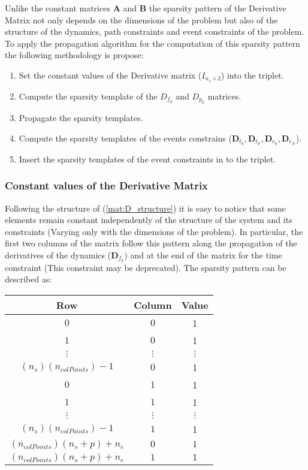 \documentclass[12pt]{article}
\begin{document}
Unlike the constant matrices $\bm{A}$ and $\bm{B}$ the sparsity pattern of the Derivative Matrix not only depends on the dimensions of the problem but also of the structure of the dynamics, path constraints and event constraints of the problem. To apply the propagation algorithm for the computation of this sparsity pattern the following methodology is propose:

\begin{enumerate}
    \item Set the constant values of the Derivative matrix ($I_{n_s \times 2}$) into the triplet.
    \item Compute the sparsity template of the $D_{f_k}$ and $D_{p_k}$ matrices.
    \item Propagate the sparsity templates.
    \item Compute the sparsity templates of the events constrains ($\bm{D}_{t_0},\bm{D}_{t_F},\bm{D}_{e_0},\bm{D}_{e_N}$).
    \item Insert the sparsity templates of the event constraints in to the triplet.
\end{enumerate}

\subsubsection{Constant values of the Derivative Matrix}

Following the structure of (\ref{mat:D_structure}) it is easy to notice that some elements remain constant independently of the structure of the system and its constraints (Varying only with the dimensions of the problem). In particular, the first two columns of the matrix follow this pattern along the propagation of the derivatives of the dynamics ($\bm{D}_{f_k}$) and at the end of the matrix for the time constraint (This constraint may be deprecated). The sparsity pattern can be described as:

\begin{table}[h]
\begin{center}
\begin{tabular}{c|c|c}
Row    & Column        & Value \\ \hline
$0$      & $0$             & 1    \\
$1$    & $0$           & 1    \\
$\vdots$ & $\vdots$   &    $\vdots$     \\
$(n_s)(n_{colPoints})-1$ & $0$        & 1    \\
$0$      & $1$             & 1    \\
$1$    & $1$           & 1    \\
$\vdots$ & $\vdots$   &    $\vdots$     \\
$(n_s)(n_{colPoints})-1$ & $1$        & 1 \\
$(n_{colPoints})(n_s+p)+n_e$ & $0$ &$1$\\
$(n_{colPoints})(n_s+p)+n_e$ & $1$ &$1$\\
\end{tabular}
\end{center}
\end{table}
\end{document}
